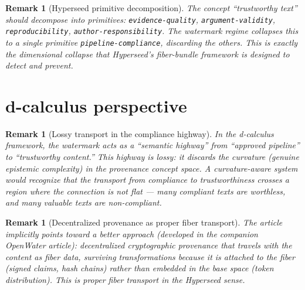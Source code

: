 \documentclass[11pt,a4paper]{article}
\newtheorem{remark}[definition]{Remark}
\begin{document}
\begin{remark}[Hyperseed primitive decomposition]
The concept ``trustworthy text'' should decompose into primitives:
\texttt{evidence-quality}, \texttt{argument-validity},
\texttt{reproducibility}, \texttt{author-responsibility}. The watermark
regime collapses this to a single primitive \texttt{pipeline-compliance},
discarding the others. This is exactly the dimensional collapse that
Hyperseed's fiber-bundle framework is designed to detect and prevent.
\end{remark}

\section{d-calculus perspective}
\label{sec:d-calc}

\begin{remark}[Lossy transport in the compliance highway]
In the d-calculus framework, the watermark acts as a ``semantic highway''
from ``approved pipeline'' to ``trustworthy content.'' This highway is
lossy: it discards the curvature (genuine epistemic complexity) in the
provenance concept space. A curvature-aware system would recognize that
the transport from compliance to trustworthiness crosses a region where
the connection is not flat --- many compliant texts are worthless, and
many valuable texts are non-compliant.
\end{remark}

\begin{remark}[Decentralized provenance as proper fiber transport]
The article implicitly points toward a better approach (developed in
the companion OpenWater article): decentralized cryptographic provenance
that travels \emph{with} the content as fiber data, surviving
transformations because it is attached to the fiber (signed claims,
hash chains) rather than embedded in the base space (token distribution).
This is proper fiber transport in the Hyperseed sense.
\end{remark}
\end{document}
